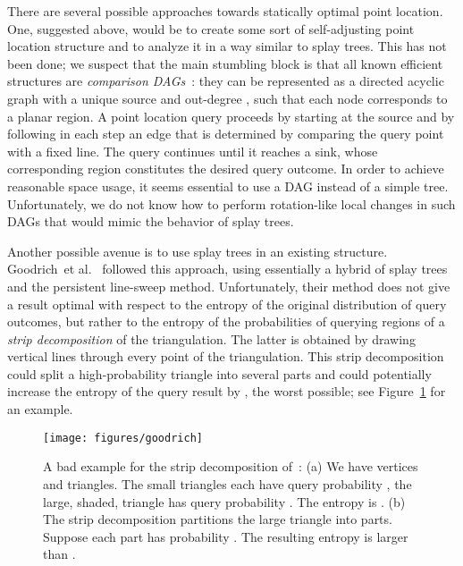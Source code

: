 \documentclass[11pt]{article}
\newcommand{\etal}{et al.}
\begin{document}
There are several possible approaches towards statically optimal
point location. One, suggested above, would be to create 
some sort of
self-adjusting point location structure and to analyze it in a way similar to
splay trees. This has not been done; we suspect that the main stumbling block is
that all known efficient structures are 
\emph{comparison DAGs}~\cite{kirk,ppl5,EdelsbrunnerGuSt86,Mulmuley90,trapseidel}: 
they can 
be represented as a directed acyclic graph with a unique source and 
out-degree , such that each node corresponds to a planar region. A 
point location
query proceeds by starting at the source and by following in each step
an edge that is determined by comparing the query point with a fixed line.
The query continues until it reaches a sink, whose corresponding region
constitutes the desired query outcome. In order to achieve 
reasonable space
usage, it seems essential to use a DAG instead of  a simple tree.
Unfortunately, we do not know how to  perform 
rotation-like local changes in such DAGs that would mimic the behavior of
splay trees.

Another possible avenue is to use splay trees in an
existing structure. Goodrich~\etal~\cite{goodrich2} followed this approach,
using essentially a hybrid of splay trees and the persistent line-sweep
method. Unfortunately, their method does not give a result
optimal with respect to the entropy of the original distribution of
query outcomes,
but rather to the entropy of the probabilities of querying
regions of a \emph{strip decomposition} of the triangulation. 
The latter is obtained
by drawing vertical lines through every point of the triangulation. 
This strip decomposition could split a high-probability triangle 
into several parts
and could potentially increase the entropy of the query result by 
, the worst possible; see Figure~\ref{fig:goodrich} 
for an example.
\begin{figure}[ht]
\begin{center}
\texttt{[image: figures/goodrich]}
\end{center}
\caption{A bad example for the strip decomposition of~\cite{goodrich2}: 
(a) We have  vertices
and  triangles. The small triangles each have query probability
, the large, shaded, triangle has query probability .
The entropy is . 
(b) The strip decomposition partitions the large
triangle into  parts. Suppose each part has probability 
. The resulting entropy is
larger than .}

\label{fig:goodrich}
\end{figure}
\end{document}
